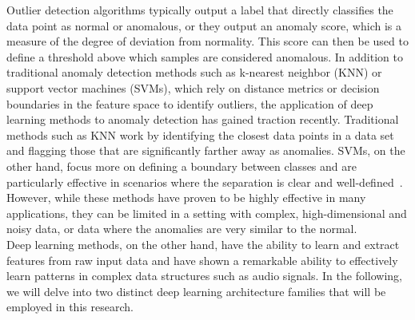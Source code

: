 Outlier detection algorithms typically output a label that directly classifies the data point as normal or anomalous, or they output an anomaly score, which is a measure of the degree of deviation from normality. This score can then be used to define a threshold above which samples are considered anomalous. In addition to traditional anomaly detection methods such as k-nearest neighbor (KNN) or support vector machines (SVMs), which rely on distance metrics or decision boundaries in the feature space to identify outliers, the application of deep learning methods to anomaly detection has gained traction recently. Traditional methods such as KNN work by identifying the closest data points in a data set and flagging those that are significantly farther away as anomalies. SVMs, on the other hand, focus more on defining a boundary between classes and are particularly effective in scenarios where the separation is clear and well-defined~\cite{chandola2009anomaly}. However, while these methods have proven to be highly effective in many applications, they can be limited in a setting with complex, high-dimensional and noisy data, or data where the anomalies are very similar to the normal.\\
Deep learning methods, on the other hand, have the ability to learn and extract features from raw input data and have shown a remarkable ability to effectively learn patterns in complex data structures such as audio signals. In the following, we will delve into two distinct deep learning architecture families that will be employed in this research.


